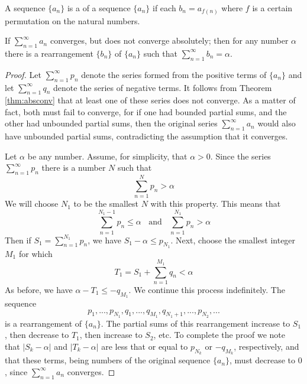 \begin{defn}
    A sequence $\{a_n\}$ is a  of a sequence $\{a_n\}$ if each $b_n = a_{f(n)}$ where $f$ is a certain permutation on the natural numbers.
\end{defn}



\begin{thm}
    If $\sum\limits_{n=1}^{\infty}a_n$ converges, but does not converge absolutely; then for any number $\alpha$ there is a rearrangement $\{b_n\}$ of $\{a_n\}$ such that $\sum\limits_{n=1}^{\infty}b_n = \alpha$.
\end{thm}
\begin{proof}
    Let $\sum\limits_{n=1}^{\infty}p_n$ denote the series formed from the positive terms of $\{a_n\}$ and let $\sum\limits_{n=1}^{\infty}q_n$ denote the series of negative terms. It follows from Theorem \ref{thm:absconv} that at least one of these series does not converge. As a matter of fact, both must fail to converge, for if one had bounded partial sums, and the other had unbounded partial sums, then the original series $\sum\limits_{n=1}^{\infty}a_n$ would also have unbounded partial sums, contradicting the assumption that it converges.

    Let $\alpha$ be any number. Assume, for simplicity, that $\alpha > 0$. Since the series $\sum\limits_{n=1}^{\infty}p_n$ there is a number $N$ such that \begin{equation*}
        \sum\limits_{n=1}^Np_n > \alpha
    \end{equation*}
    We will choose $N_1$ to be the smallest $N$ with this property. This means that \begin{equation*}
        \sum\limits_{n=1}^{N_1-1}p_n \leq \alpha\;\;\text{ and }\;\;\sum\limits_{n=1}^{N_1}p_n > \alpha
    \end{equation*}
    Then if $S_1 = \sum\limits_{n=1}^{N_1}p_n$, we have $S_1 - \alpha \leq p_{N_1}$. Next, choose the smallest integer $M_1$ for which \begin{equation*}
        T_1 = S_1 + \sum\limits_{n=1}^{M_1}q_n < \alpha
    \end{equation*}
    As before, we have $\alpha - T_1 \leq -q_{M_1}$. We continue this process indefinitely. The sequence \begin{equation*}
        p_1,...,p_{N_1},q_1,...,q_{M_1},q_{N_1+1},...,p_{N_2},...
    \end{equation*}
    is a rearrangement of $\{a_n\}$. The partial sums of this rearrangement increase to $S_1$, then decrease to $T_1$, then increase to $S_2$, etc. To complete the proof we note that $|S_k -\alpha|$ and $|T_k - \alpha|$ are less that or equal to $p_{N_k}$ or $-q_{M_k}$, respectively, and that these terms, being numbers of the original sequence $\{a_n\}$, must decrease to $0$, since $\sum\limits_{n=1}^{\infty}a_n$ converges.
\end{proof}



